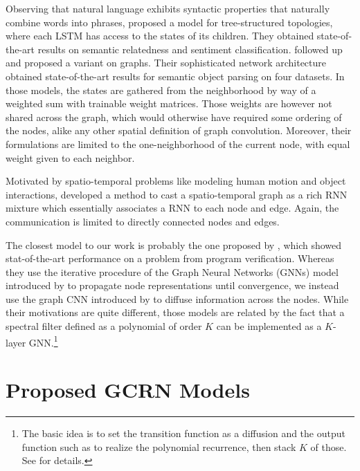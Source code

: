 \documentclass{article} %
\begin{document}
Observing that natural language exhibits syntactic properties that naturally
combine words into phrases, \citet{treelstm} proposed a model for
tree-structured topologies, where each LSTM has access to the states of its
children. They obtained state-of-the-art results on semantic relatedness and
sentiment classification. \citet{graphlstm} followed up and proposed a variant
on graphs. Their sophisticated network architecture obtained state-of-the-art
results for semantic object parsing on four datasets. In those models, the
states are gathered from the neighborhood by way of a weighted sum with
trainable weight matrices. Those weights are however not shared across the
graph, which would otherwise have required some ordering of the nodes, alike
any other spatial definition of graph convolution. Moreover, their formulations
are limited to the one-neighborhood of the current node, with equal weight
given to each neighbor.

Motivated by spatio-temporal problems like modeling human motion and object
interactions, \citet{structuralrnn} developed a method to cast a
spatio-temporal graph as a rich RNN mixture which essentially associates a RNN
to each node and edge. Again, the communication is limited to directly
connected nodes and edges.


The closest model to our work is probably the one proposed by \citet{ggsnn_li},
which showed stat-of-the-art performance on a problem from program
verification. Whereas they use the iterative procedure of the Graph Neural
Networks (GNNs) model introduced by \citet{gnn_scarcelli} to propagate node
representations until convergence, we instead use the graph CNN introduced by
\citet{gcnn} to diffuse information across the nodes. While their motivations
are quite different, those models are related by the fact that a spectral
filter defined as a polynomial of order $K$ can be implemented as a $K$-layer
GNN.\footnote{The basic idea is to set the transition function as a diffusion
and the output function such as to realize the polynomial recurrence, then
stack $K$ of those. See \citet{gcnn} for details.}

\section{Proposed GCRN Models}
\label{sec:our_models}

\end{document}

